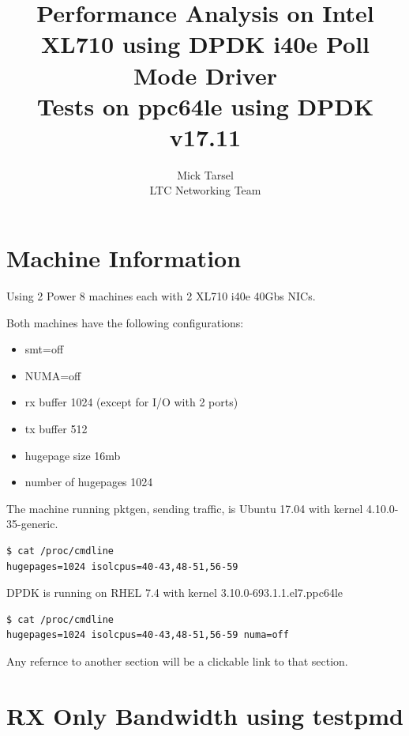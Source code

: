 \documentclass[letter]{article}
\title{Performance Analysis on Intel XL710 using DPDK i40e Poll Mode Driver \\ Tests on ppc64le using DPDK v17.11}
\author{Mick Tarsel \\  LTC Networking Team \\}
\begin{document}

\maketitle

\newpage
\tableofcontents
\newpage

\section{Machine Information}
{\setlength{\parindent}{0cm}

Using 2 Power 8 machines each with 2 XL710 i40e 40Gbs NICs.

Both machines have the following configurations:
\begin{itemize}
\item smt=off
\item NUMA=off
\item rx buffer 1024 (except for I/O with 2 ports)
\item tx buffer 512
\item hugepage size 16mb
\item number of hugepages 1024
\end{itemize}

The machine running pktgen, sending traffic, is Ubuntu 17.04 with kernel 4.10.0-35-generic.
\begin{lstlisting}[escapechar=!]
$ cat /proc/cmdline
hugepages=1024 isolcpus=40-43,48-51,56-59
\end{lstlisting}
 
DPDK is running on RHEL 7.4 with kernel 3.10.0-693.1.1.el7.ppc64le
\begin{lstlisting}[escapechar=!]
$ cat /proc/cmdline
hugepages=1024 isolcpus=40-43,48-51,56-59 numa=off
\end{lstlisting}
Any refernce to another section will be a clickable link to that section.


\section{RX Only Bandwidth using testpmd}
{\setlength{\parindent}{0cm}

}}
\end{document}
